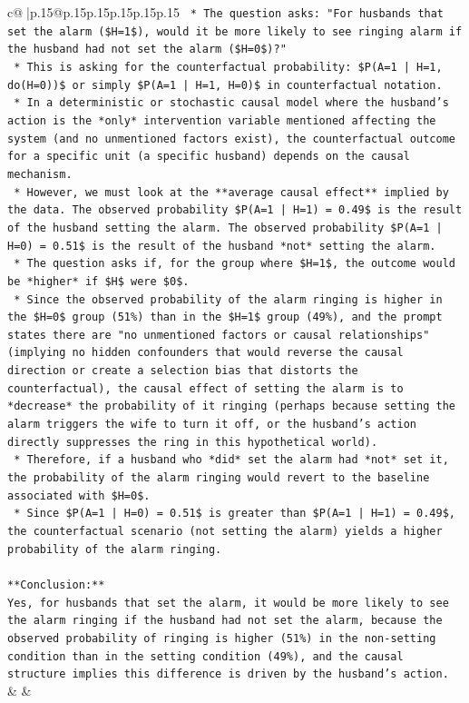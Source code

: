 \documentclass{article}
\begin{document}
{\begin{supertabular}{c@{$\;$}|p{.15\linewidth}@{}p{.15\linewidth}p{.15\linewidth}p{.15\linewidth}p{.15\linewidth}p{.15\linewidth}}
{{{\texttt{    *   The question asks: "For husbands that set the alarm (\$H=1\$), would it be more likely to see ringing alarm if the husband had not set the alarm (\$H=0\$)?"} \\
\texttt{    *   This is asking for the counterfactual probability: \$P(A=1 | H=1, do(H=0))\$ or simply \$P(A=1 | H=1, H=0)\$ in counterfactual notation.} \\
\texttt{    *   In a deterministic or stochastic causal model where the husband's action is the *only* intervention variable mentioned affecting the system (and no unmentioned factors exist), the counterfactual outcome for a specific unit (a specific husband) depends on the causal mechanism.} \\
\texttt{    *   However, we must look at the **average causal effect** implied by the data. The observed probability \$P(A=1 | H=1) = 0.49\$ is the result of the husband setting the alarm. The observed probability \$P(A=1 | H=0) = 0.51\$ is the result of the husband *not* setting the alarm.} \\
\texttt{    *   The question asks if, for the group where \$H=1\$, the outcome would be *higher* if \$H\$ were \$0\$.} \\
\texttt{    *   Since the observed probability of the alarm ringing is higher in the \$H=0\$ group (51\%) than in the \$H=1\$ group (49\%), and the prompt states there are "no unmentioned factors or causal relationships" (implying no hidden confounders that would reverse the causal direction or create a selection bias that distorts the counterfactual), the causal effect of setting the alarm is to *decrease* the probability of it ringing (perhaps because setting the alarm triggers the wife to turn it off, or the husband's action directly suppresses the ring in this hypothetical world).} \\
\texttt{    *   Therefore, if a husband who *did* set the alarm had *not* set it, the probability of the alarm ringing would revert to the baseline associated with \$H=0\$.} \\
\texttt{    *   Since \$P(A=1 | H=0) = 0.51\$ is greater than \$P(A=1 | H=1) = 0.49\$, the counterfactual scenario (not setting the alarm) yields a higher probability of the alarm ringing.} \\
\\ 
\texttt{**Conclusion:**} \\
\texttt{Yes, for husbands that set the alarm, it would be more likely to see the alarm ringing if the husband had not set the alarm, because the observed probability of ringing is higher (51\%) in the non{-}setting condition than in the setting condition (49\%), and the causal structure implies this difference is driven by the husband's action.} \\
            }
        }
    }
    & & \\ \\


\end{supertabular}}
\end{document}
